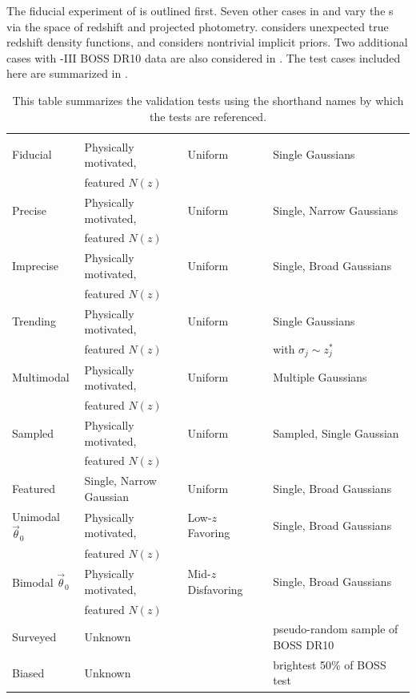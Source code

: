 The fiducial experiment of  is outlined first. 
Seven other cases in  and  vary the \pzpdf s via the space of redshift and projected photometry.
 considers unexpected true redshift density functions, and  considers nontrivial implicit priors.  
Two additional cases with \sdss-III BOSS DR10 data are also considered in .
The test cases included here are summarized in .

\begin{table}
	\begin{tabular}{llll}
		\textul{Title} & \textul{True $n(z)$} & \textul{Implicit Prior} & 
		\textul{Probability space}\\
		Fiducial & Physically motivated, & Uniform & Single Gaussians\\
		& featured $N(z)$ &&\\
		Precise & Physically motivated, & Uniform & Single, Narrow Gaussians\\
		& featured $N(z)$ &&\\
		Imprecise & Physically motivated, & Uniform & Single, Broad Gaussians\\
		& featured $N(z)$ &&\\
		Trending & Physically motivated, & Uniform & Single Gaussians\\
		& featured $N(z)$ && with $\sigma_{j}\sim z^{*}_{j}$\\
		Multimodal & Physically motivated, & Uniform & Multiple Gaussians\\
		& featured $N(z)$ &&\\
		Sampled & Physically motivated, & Uniform & Sampled, Single Gaussian\\
		& featured $N(z)$ &&\\
		Featured & Single, Narrow Gaussian & Uniform & Single, Broad Gaussians\\
		Unimodal $\vec{\theta}_{0}$ & Physically motivated, & Low-$z$ Favoring & 
		Single, Broad Gaussians\\
		& featured $N(z)$ &&\\
		Bimodal $\vec{\theta}_{0}$& Physically motivated, & Mid-$z$ Disfavoring & 
		Single, Broad Gaussians\\
		& featured $N(z)$ &&\\
		Surveyed & Unknown & \citet{Sheldon2012} & pseudo-random sample of BOSS DR10\\
		Biased & Unknown & \citet{Sheldon2012} & brightest 50\% of BOSS test
	\end{tabular}
	\caption{This table summarizes the validation tests using the shorthand names by which the tests are referenced.}
\end{table}

